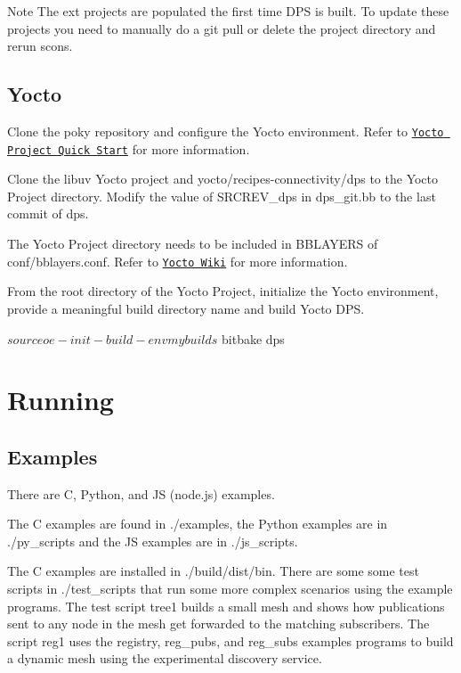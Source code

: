 \begin{DoxyNote}{Note}
The ext projects are populated the first time D\+PS is built. To update these projects you need to manually do a {\ttfamily git pull} or delete the project directory and rerun scons.
\end{DoxyNote}
\hypertarget{building-and-running_building-yocto}{}\subsection{Yocto}\label{building-and-running_building-yocto}
Clone the poky repository and configure the Yocto environment. Refer to \href{http://www.yoctoproject.org/docs/1.8/yocto-project-qs/yocto-project-qs.html}{\tt Yocto Project Quick Start} for more information.

Clone the libuv Yocto project and yocto/recipes-\/connectivity/dps to the Yocto Project directory. Modify the value of S\+R\+C\+R\+E\+V\+\_\+dps in dps\+\_\+git.\+bb to the last commit of dps.

The Yocto Project directory needs to be included in B\+B\+L\+A\+Y\+E\+RS of conf/bblayers.\+conf. Refer to \href{https://wiki.yoctoproject.org/wiki/How_do_I}{\tt Yocto Wiki} for more information.

From the root directory of the Yocto Project, initialize the Yocto environment, provide a meaningful build directory name and build Yocto D\+PS.

\begin{DoxyVerb}$ source oe-init-build-env mybuilds
$ bitbake dps
\end{DoxyVerb}
\hypertarget{building-and-running_running}{}\section{Running}\label{building-and-running_running}
\hypertarget{building-and-running_running-examples}{}\subsection{Examples}\label{building-and-running_running-examples}
There are C, Python, and JS (node.\+js) examples.

The C examples are found in {\ttfamily ./examples}, the Python examples are in {\ttfamily ./py\+\_\+scripts} and the JS examples are in {\ttfamily ./js\+\_\+scripts}.

The C examples are installed in {\ttfamily ./build/dist/bin}. There are some some test scripts in {\ttfamily }./test\+\_\+scripts that run some more complex scenarios using the example programs. The test script {\ttfamily tree1} builds a small mesh and shows how publications sent to any node in the mesh get forwarded to the matching subscribers. The script {\ttfamily reg1} uses the {\ttfamily registry}, {\ttfamily reg\+\_\+pubs}, and {\ttfamily reg\+\_\+subs} examples programs to build a dynamic mesh using the experimental discovery service. 